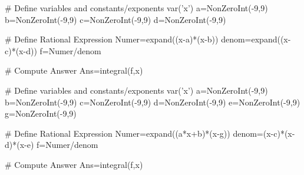

\begin{sagesilent}
# Define variables and constants/exponents
var('x')
a=NonZeroInt(-9,9)
b=NonZeroInt(-9,9)
c=NonZeroInt(-9,9)
d=NonZeroInt(-9,9)


# Define Rational Expression
Numer=expand((x-a)*(x-b))
denom=expand((x-c)*(x-d))
f=Numer/denom

# Compute Answer
Ans=integral(f,x)
\end{sagesilent}


\begin{sagesilent}
# Define variables and constants/exponents
var('x')
a=NonZeroInt(-9,9)
b=NonZeroInt(-9,9)
c=NonZeroInt(-9,9)
d=NonZeroInt(-9,9)
e=NonZeroInt(-9,9)
g=NonZeroInt(-9,9)


# Define Rational Expression
Numer=expand((a*x+b)*(x-g))
denom=(x-c)*(x-d)*(x-e)
f=Numer/denom

# Compute Answer
Ans=integral(f,x)
\end{sagesilent}




